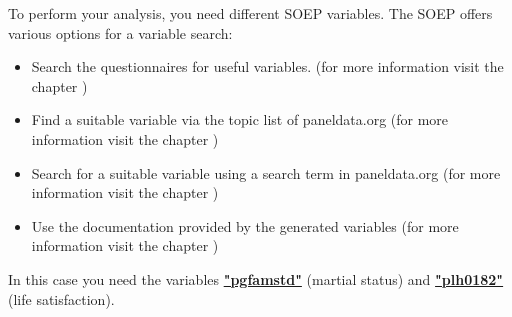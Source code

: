 \documentclass[letterpaper,10pt,openany,onesideH,english]{sphinxmanual}
\begin{document}

To perform your analysis, you need different SOEP variables. The SOEP offers various options for a variable search:
\begin{itemize}
\item {} 
Search the questionnaires for useful variables. (for more information visit the chapter {\hyperref[\detokenize{Working with SOEP Documentation/index:quest-search}]{}})

\item {} 
Find a suitable variable via the topic list of paneldata.org (for more information visit the chapter {\hyperref[\detokenize{Working with SOEP Documentation/index:topic}]{}})

\item {} 
Search for a suitable variable using a search term in paneldata.org (for more information visit the chapter {\hyperref[\detokenize{Working with SOEP Documentation/index:var-search}]{}})

\item {} 
Use the documentation provided by the generated variables (for more information visit the chapter {\hyperref[\detokenize{Working with SOEP Documentation/index:documentation}]{}})

\end{itemize}

In this case you need the variables  \href{https://paneldata.org/soep-long/data/pgen/pgfamstd}{\textbf{"pgfamstd"}} (martial status) and  \href{https://paneldata.org/soep-long/data/pl/plh0182}{\textbf{"plh0182"}} (life satisfaction).
\end{document}
